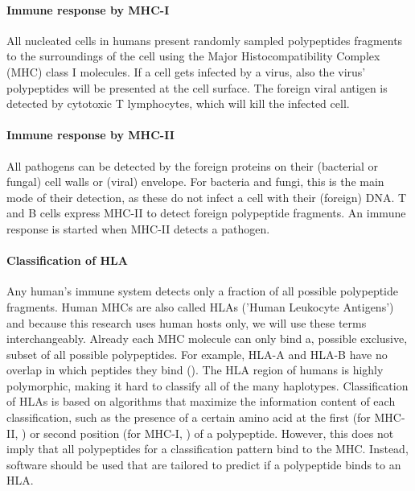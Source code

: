 \documentclass{article}
\begin{document}
\paragraph{Immune response by MHC-I}

All nucleated cells in humans present randomly sampled polypeptides
fragments to the surroundings of the cell using the Major 
Histocompatibility Complex (MHC) class I molecules.
If a cell gets infected by a virus, also the virus' polypeptides
will be presented at the cell surface. The foreign viral antigen is detected 
by cytotoxic T lymphocytes, which will kill the infected cell.

\paragraph{Immune response by MHC-II}

All pathogens can be detected by the foreign proteins on 
their (bacterial or fungal) cell walls or (viral) envelope.
For bacteria and fungi, this is the main mode of their detection,
as these do not infect a cell with their (foreign) DNA.
T and B cells express MHC-II to detect foreign polypeptide fragments.
An immune response is started when MHC-II detects a pathogen.

\paragraph{Classification of HLA}

Any human's immune system detects only a fraction of all possible
polypeptide fragments. 
Human MHCs are also called HLAs ('Human Leukocyte Antigens') and
because this research uses human hosts only, we will use these terms
interchangeably.
Already each MHC molecule can only bind a, possible exclusive,
subset of all possible polypeptides.
For example, HLA-A and HLA-B have no overlap in which
peptides they bind (\cite{lund2004definition}).
The HLA region of humans is highly polymorphic, 
making it hard to classify all of the many haplotypes.
Classification of HLAs is based on algorithms that
maximize the information content of each 
classification, such as the presence of a certain amino acid at 
the first (for MHC-II, \cite{southwood1998several})
or second position (for MHC-I, \cite{lund2004definition}) of a polypeptide.
However, this does not imply that all polypeptides for a classification
pattern bind to the MHC. Instead, software should be used that are
tailored to predict if a polypeptide binds to an HLA.
\end{document}
